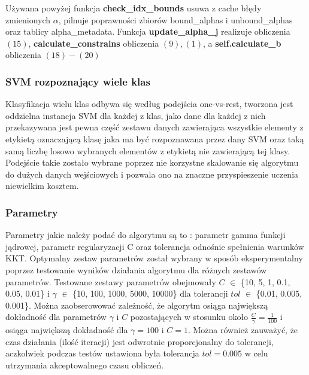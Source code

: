 \documentclass[11pt]{article}
\begin{document}
    Używana powyżej funkcja \textbf{check\_idx\_bounds} usuwa z cache błędy
zmienionych \(\alpha\), pilnuje poprawności zbiorów bound\_alphas i
unbound\_alphas oraz tablicy alpha\_metadata. Funkcja
\textbf{update\_alpha\_j} realizuje obliczenia \((15)\),
\textbf{calculate\_constrains} obliczenia \((9), (1)\), a
\textbf{self.calculate\_b} obliczenia \((18) - (20)\)

    \hypertarget{svm-rozpoznajux105cy-wiele-klas}{%
\subsubsection{SVM rozpoznający wiele
klas}\label{svm-rozpoznajux105cy-wiele-klas}}

Klasyfikacja wielu klas odbywa się według podejścia one-vs-rest,
tworzona jest oddzielna instancja SVM dla każdej z klas, jako dane dla
każdej z nich przekazywana jest pewna część zestawu danych zawierająca
wszystkie elementy z etykietą oznaczającą klasę jaka ma być rozpoznawana
przez dany SVM oraz taką samą liczbę losowo wybranych elementów z
etykietą nie zawierającą tej klasy. Podejście takie zostało wybrane
poprzez nie korzystne skalowanie się algorytmu do dużych danych
wejściowych i pozwala ono na znaczne przyspieszenie uczenia niewielkim
kosztem.

    \hypertarget{parametry}{%
\subsubsection{Parametry}\label{parametry}}

Parametry jakie należy podać do algorytmu są to : parametr gamma funkcji
jądrowej, parametr regularyzacji C oraz tolerancja odnośnie spełnienia
warunków KKT. Optymalny zestaw parametrów został wybrany w sposób
eksperymentalny poprzez testowanie wyników działania algorytmu dla
różnych zestawów parametrów. Testowane zestawy parametrów obejmowały
\(C\) \(\in\) \{10, 5, 1, 0.1, 0.05, 0.01\} i \(\gamma\) \(\in\) \{10,
100, 1000, 5000, 10000\} dla tolerancji \(tol\) \(\in\) \{0.01, 0.005,
0.001\}. Można zaobserowować zależność, że algorytm osiąga największą
dokładność dla parametrów \(\gamma\) i \(C\) pozostających w stosunku
około \(\frac{C}{\gamma} = \frac{1}{100}\) i osiąga największą
dokładność dla \(\gamma = 100\) i \(C = 1\). Można również zauważyć, że
czas działania (ilość iteracji) jest odwrotnie proporcjonalny do
tolerancji, aczkolwiek podczas testów ustawiona była tolerancja
\(tol = 0.005\) w celu utrzymania akceptowalnego czasu obliczeń.
\end{document}
